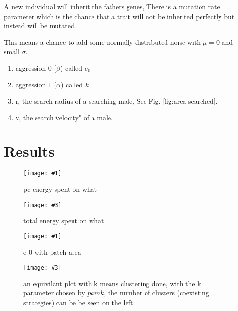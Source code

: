 \documentclass[a4paper,11pt]{article}
\newcommand{\myfigure}[4]{
\begin{figure}[h!]
    \centering
    \texttt{[image: \#1]}
    \caption{#2}
    \centering
    \texttt{[image: \#3]}
    \caption{#4}
\end{figure}
}
\begin{document}
A new individual will inherit the fathers genes,
There is a mutation rate parameter which is the chance that a trait will not be inherited perfectly but instead will be mutated.

This means a chance to add some normally distributed noise with $\mu = 0$ and small $\sigma$.

\begin{enumerate}
    \item aggression 0 ($\beta$) called $e_0$
    \item aggression 1 ($\alpha$) called $k$
    
    \item r, the search radius of a searching male, See Fig. \ref{fig:area searched}.
    \item v, the search \"velocity" of a male.
\end{enumerate}

\clearpage

\section{Results} %
\label{sec:results}

\myfigure{figures/energy_pc_plot_cm_100.png}{pc energy spent on what}{figures/energy_total_plot_cm_100.png}{total energy spent on what}

\myfigure{figures/e_0_patch_area.png}{e 0 with patch area}{figures/clustered_e_0_plot.pdf}{an equivilant plot with k means clustering done, with the k parameter chosen by $pamk$, the number of clusters (coexisting strategies) can be be seen on the left}
\end{document}
